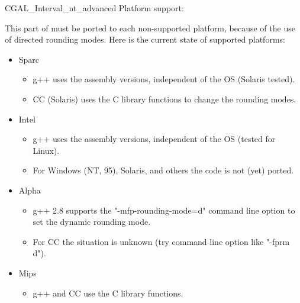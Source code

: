 \begin{ccAdvanced}
\begin{ccClass} {CGAL_Interval_nt_advanced}
Platform support:

This part of {\cgal} must be ported to each non-supported platform, because
of the use of directed rounding modes.  
Here is the current state of supported platforms:

\begin{itemize}
\item Sparc
\begin{itemize}
\item g++ uses the assembly versions, independent of the OS (Solaris tested).
\item CC (Solaris) uses the C library functions to change the rounding modes.
\end{itemize}
\item Intel
\begin{itemize}
\item g++ uses the assembly versions, independent of the OS (tested for Linux).
\item For Windows (NT, 95), Solaris, and others the code is not (yet) ported.
\end{itemize}
\item Alpha
\begin{itemize}
\item g++ 2.8 supports the "-mfp-rounding-mode=d" command line option
      to set the dynamic rounding mode.
\item For CC the situation is unknown (try command line option like "-fprm d").
\end{itemize}
\item Mips
\begin{itemize}
\item g++ and CC use the C library functions.
\end{itemize}
\end{itemize}

\end{ccClass}

\end{ccAdvanced}
